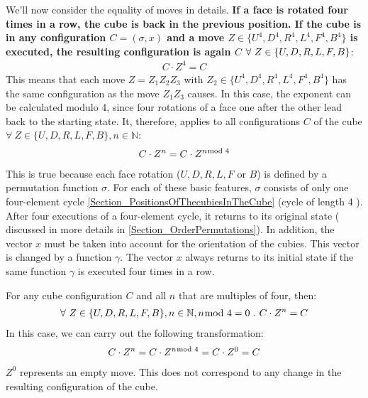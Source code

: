 We'll now consider the equality of moves in details.
\textbf {If a face is rotated four times in a row, the cube is back in the previous position. If the cube is in any configuration $C = (\sigma, x)$ and a move $Z \in \{ U^4, D^4, R^4, L^4, F^4, B^4 \}$ is executed, the resulting configuration is again $C$} $\forall \ Z \in \{ U, D, R, L, F, B\} \\ $:
\begin{align*}
C \cdot Z^4 = C
\end{align*}
This means that each move $Z = Z_1Z_2Z_3$ with $Z_2 \in \{ U^4, D^4, R^4, L^4, F^4, B^4\}$ has the same configuration as the move $Z_1Z_3$ causes.
In this case, the exponent can be calculated modulo 4, since four rotations of a face one after the other lead back to the starting state.
It, therefore, applies to all configurations $C$ of the cube $\forall \ Z \in \{U, D, R, L, F, B\}, n \in \mathbb{N} $:
\begin{align*}
 C \cdot Z^n= C \cdot Z^{n \hspace*{-0.5em} \mod 4}
\end{align*}
This is true because each face rotation ($U, D, R, L, F$ or $B$) is defined by a permutation function $\sigma$. For each of these basic features, $\sigma$ consists of only one four-element cycle \ref{Section_PositionsOfThecubiesInTheCube} (cycle of length 4 ).  After four executions of a four-element cycle, it returns to its original state ( discussed in more details in \ref{Section_OrderPermutations}). In addition, the vector $x$ must be taken into account for the orientation of the cubies. This vector is changed by a function $\gamma$. The vector $x$ always returns to its initial state if the same function $\gamma$ is executed four times in a row. 


For any cube configuration $C$ and all $n$ that are multiples of four, then:
\begin{align*}
\forall \ Z \in \{U, D, R, L, F, B\}, n \in \mathbb{N}, n \hspace*{-0.6em} \mod 4 = 0 \ . \
C \cdot Z^n
= C
\end{align*}
In this case, we can carry out the following transformation:
\begin{align*}
C \cdot Z^n
= C \cdot Z^{n \hspace*{-0.5em} \mod 4}
= C \cdot Z^0
= C
\end{align*}
$Z^0$ represents an empty move. This does not correspond to any change in the resulting configuration of the cube.

